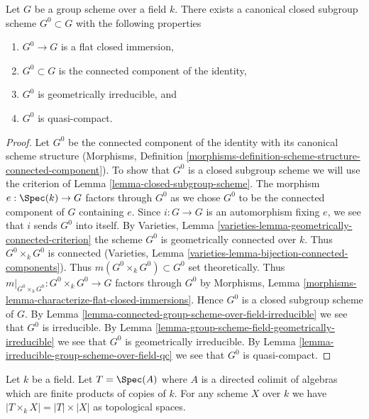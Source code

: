 \begin{proposition}
\label{proposition-connected-component}
Let $G$ be a group scheme over a field $k$. There exists a canonical closed
subgroup scheme $G^0 \subset G$ with the following properties
\begin{enumerate}
\item $G^0 \to G$ is a flat closed immersion,
\item $G^0 \subset G$ is the connected component of the identity,
\item $G^0$ is geometrically irreducible, and
\item $G^0$ is quasi-compact.
\end{enumerate}
\end{proposition}

\begin{proof}
Let $G^0$ be the connected component of the identity with its canonical
scheme structure (Morphisms, Definition
\ref{morphisms-definition-scheme-structure-connected-component}).
To show that $G^0$ is a closed subgroup scheme we will use the
criterion of Lemma \ref{lemma-closed-subgroup-scheme}.
The morphism $e : \Spec(k) \to G$ factors through $G^0$ as we chose
$G^0$ to be the connected component of $G$ containing $e$.
Since $i : G \to G$ is an automorphism fixing $e$, we see that
$i$ sends $G^0$ into itself.
By Varieties, Lemma \ref{varieties-lemma-geometrically-connected-criterion}
the scheme $G^0$ is geometrically connected over $k$.
Thus $G^0 \times_k G^0$ is connected
(Varieties, Lemma \ref{varieties-lemma-bijection-connected-components}).
Thus $m(G^0 \times_k G^0) \subset G^0$ set theoretically.
Thus $m|_{G^0 \times_k G^0} : G^0 \times_k G^0 \to G$
factors through $G^0$ by
Morphisms, Lemma \ref{morphisms-lemma-characterize-flat-closed-immersions}.
Hence $G^0$ is a closed subgroup scheme of $G$.
By Lemma \ref{lemma-connected-group-scheme-over-field-irreducible}
we see that $G^0$ is irreducible. By
Lemma \ref{lemma-group-scheme-field-geometrically-irreducible}
we see that $G^0$ is geometrically irreducible. By
Lemma \ref{lemma-irreducible-group-scheme-over-field-qc}
we see that $G^0$ is quasi-compact.
\end{proof}

\begin{lemma}
\label{lemma-profinite-product-over-field}
Let $k$ be a field. Let $T = \Spec(A)$ where $A$ is a directed colimit of
algebras which are finite products of copies of $k$. For any scheme $X$
over $k$ we have $|T \times_k X| = |T| \times |X|$ as topological spaces.
\end{lemma}

